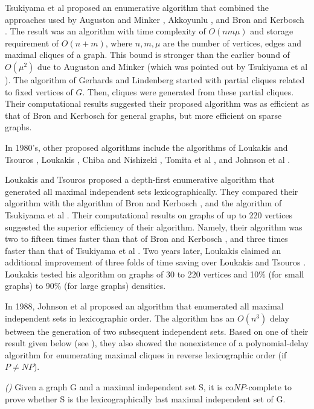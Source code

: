 Tsukiyama et al \cite{TsIdAvSh77} proposed an enumerative algorithm
that combined the approaches used by Auguston and Minker
\cite{AuMi70}, Akkoyunlu \cite{Akk73}, and Bron and Kerbosch
\cite{BrKe73}. The result was an algorithm with time complexity of
$O(nm \mu)$ and storage requirement of $O(n+m)$, where $n, m, \mu$
are the number of vertices, edges and maximal cliques of a graph.
This bound is stronger than the earlier bound of $O(\mu^{2})$
due to Auguston and Minker \cite{AuMi70} (which was pointed out by
Tsukiyama et al \cite{TsIdAvSh77}). The algorithm of Gerhards and
Lindenberg \cite{GeLi79} started with partial cliques related to
fixed vertices of $G$. Then, cliques were generated from these
partial cliques. Their computational results suggested their
proposed algorithm was as efficient as that of Bron and Kerbosch
\cite{BrKe73} for general graphs, but more efficient on sparse
graphs.

In 1980's, other proposed algorithms include the algorithms of Loukakis
and Tsouros \cite{LoTs81}, Loukakis \cite{Lou83}, Chiba and Nishizeki
\cite{ChNi85}, Tomita et al \cite{ToTaTa88}, and Johnson et al
\cite{JoYaPa88}.

Loukakis and Tsouros \cite{LoTs81} proposed a depth-first
enumerative algorithm that generated all maximal independent sets
lexicographically. They compared their algorithm with the algorithm
of Bron and Kerbosch \cite{BrKe73}, and the algorithm of Tsukiyama
et al \cite{TsIdAvSh77}. Their computational results on graphs of up
to 220 vertices suggested the superior efficiency of their
algorithm. Namely, their algorithm was two to fifteen times faster
than that of Bron and Kerbosch \cite{BrKe73}, and three times faster
than that of Tsukiyama et al \cite{TsIdAvSh77}. Two years later,
Loukakis \cite{Lou83} claimed an additional improvement of three
folds of time saving over Loukakis and Tsouros \cite{LoTs81}.
Loukakis \cite{Lou83} tested his algorithm on graphs of 30 to 220
vertices and 10\% (for small graphs) to 90\% (for large graphs)
densities.

In 1988, Johnson et al \cite{JoYaPa88} proposed an algorithm that
enumerated all maximal independent sets in lexicographic order. The
algorithm has an $O(n^{3})$ delay between the generation of two
subsequent independent sets. Based on one of their result given
below (see \cite{JoYaPa88}), they also showed the nonexistence of
a polynomial-delay algorithm for enumerating maximal cliques in
reverse lexicographic order (if $P \neq NP$). 


\begin{thm}
{\em (\cite{JoYaPa88})} Given a graph G and a maximal independent
set S, it is co$NP$-complete to prove whether S is the
lexicographically last maximal independent set of G.
	\label{thm31}
\end{thm}

